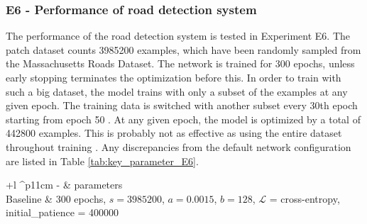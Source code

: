 \subsubsection{E6 - Performance of road detection system}
The performance of the road detection system is tested in Experiment E6. The patch dataset counts 3985200 examples, which have been randomly sampled from the Massachusetts Roads Dataset. The network is trained for 300 epochs, unless early stopping terminates the optimization before this. In order to train with such a big dataset, the model trains with only a subset of the examples at any given epoch. The training data is switched with another subset every 30th epoch starting from epoch 50 . At any given epoch, the model is optimized by a total of 442800 examples. This is probably not as effective as using the entire dataset throughout training . Any discrepancies from the default network configuration are listed in Table \ref{tab:key_parameter_E6}.
\begin{table}[h]
\caption{Key parameters for E6.}
\begin{center}
\begin{adjustbox}{max width=\textwidth}
\begin{tabular}{+l ^p{11cm}}\hline
\rowstyle{\bfseries}
  - & parameters \\\hline
  Baseline & 300 epochs, $s=3 985 200$, $a=0.0015$, $b=128$, $\mathcal{L}$ = cross-entropy, initial\_patience = 400000  \\
  \hline
\end{tabular}
\end{adjustbox}
\end{center}
\label{tab:key_parameter_E6}
\end{table}
